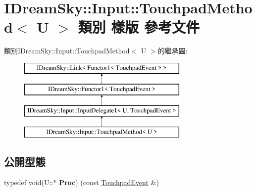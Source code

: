 \hypertarget{class_i_dream_sky_1_1_input_1_1_touchpad_method}{}\section{I\+Dream\+Sky\+:\+:Input\+:\+:Touchpad\+Method$<$ U $>$ 類別 樣版 參考文件}
\label{class_i_dream_sky_1_1_input_1_1_touchpad_method}
類別\+I\+Dream\+Sky\+:\+:Input\+:\+:Touchpad\+Method$<$ U $>$的繼承圖\+:\begin{figure}[H]
\begin{center}
\leavevmode
\includegraphics[height=4.000000cm]{class_i_dream_sky_1_1_input_1_1_touchpad_method}
\end{center}
\end{figure}
\subsection*{公開型態}
\begin{DoxyCompactItemize}
\item 
typedef void(U\+::$\ast$ {\bfseries Proc}) (const \hyperlink{class_i_dream_sky_1_1_input_1_1_touchpad_event}{Touchpad\+Event} \&)\hypertarget{class_i_dream_sky_1_1_input_1_1_touchpad_method_adbf01b45ae043400d52b5233bba925ca}{}\label{class_i_dream_sky_1_1_input_1_1_touchpad_method_adbf01b45ae043400d52b5233bba925ca}

\end{DoxyCompactItemize}
